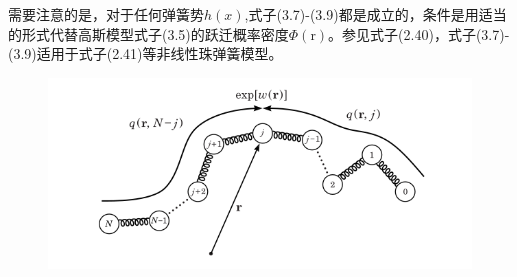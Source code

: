 需要注意的是，对于任何弹簧势$h(x)$,式子(3.7)-(3.9)都是成立的，条件是用适当的形式代替高斯模型式子(3.5)的跃迁概率密度$\Phi(\mathrm{r})$。参见式子(2.40)，式子(3.7)-(3.9)适用于式子(2.41)等非线性珠弹簧模型。
\begin{figure}[H]
\centering
\includegraphics[scale=0.7]{./figures/Figure_1.png}
\end{figure}

































